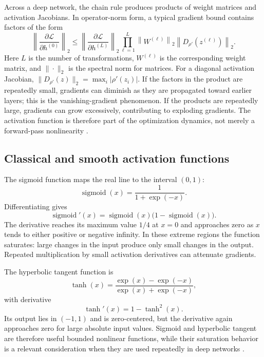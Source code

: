 Across a deep network, the chain rule produces products of weight matrices
and activation Jacobians. In operator-norm form, a typical gradient bound
contains factors of the form
\begin{equation}
    \left\|
    \frac{\partial\mathcal{L}}{\partial h^{(0)}}
    \right\|_2
    \leq
    \left\|
    \frac{\partial\mathcal{L}}{\partial h^{(L)}}
    \right\|_2
    \prod_{\ell=1}^{L}
    \left\|W^{(\ell)}\right\|_2
    \left\|D_{\rho'}(z^{(\ell)})\right\|_2.
    \label{eq:act-gradient-norm-bound}
\end{equation}
Here \(L\) is the number of transformations, \(W^{(\ell)}\) is the
corresponding weight matrix, and \(\|\cdot\|_2\) is the spectral norm for
matrices. For a diagonal activation Jacobian,
\(\|D_{\rho'}(z)\|_2=\max_i|\rho'(z_i)|\). If the factors in the product
are repeatedly small, gradients can diminish as they are propagated toward
earlier layers; this is the vanishing-gradient phenomenon. If the products
are repeatedly large, gradients can grow excessively, contributing to
exploding gradients. The activation function is therefore part of the
optimization dynamics, not merely a forward-pass nonlinearity
\parencite{lukac2026llms}.

\subsection{Classical and smooth activation functions}
\label{subsec:act-classical}

The sigmoid function maps the real line to the interval \((0,1)\):
\begin{equation}
    \operatorname{sigmoid}(x)
    =
    \frac{1}{1+\exp(-x)}.
    \label{eq:act-sigmoid}
\end{equation}
Differentiating gives
\begin{equation}
    \operatorname{sigmoid}'(x)
    =
    \operatorname{sigmoid}(x)
    \bigl(1-\operatorname{sigmoid}(x)\bigr).
    \label{eq:act-sigmoid-derivative}
\end{equation}
The derivative reaches its maximum value \(1/4\) at \(x=0\) and approaches
zero as \(x\) tends to either positive or negative infinity. In these
extreme regions the function saturates: large changes in the input produce
only small changes in the output. Repeated multiplication by small
activation derivatives can attenuate gradients.

The hyperbolic tangent function is
\begin{equation}
    \tanh(x)
    =
    \frac{\exp(x)-\exp(-x)}
         {\exp(x)+\exp(-x)},
    \label{eq:act-tanh}
\end{equation}
with derivative
\begin{equation}
    \tanh'(x)=1-\tanh^2(x).
    \label{eq:act-tanh-derivative}
\end{equation}
Its output lies in \((-1,1)\) and is zero-centered, but the derivative
again approaches zero for large absolute input values. Sigmoid and
hyperbolic tangent are therefore useful bounded nonlinear functions, while
their saturation behavior is a relevant consideration when they are used
repeatedly in deep networks \parencite{fang2023raft,lukac2026llms}.

